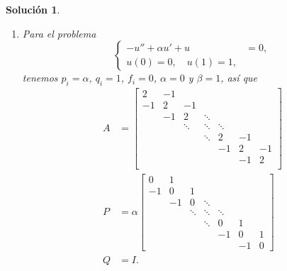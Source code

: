 \documentclass[11pt]{article}
\newtheorem*{sol}{Solución}
\begin{document}
\begin{sol}
\begin{enumerate}
\begin{equation}
      .\end{equation}
      Luego, si $|h|<\delta$, entonces
      \begin{equation}
        |\phi(h)| \geq (\det A) / 2 > 0
      ,\end{equation}
      de donde se sigue que
      \begin{equation}
        \phi(h) = \det \left(A + \frac{1}{2}hP + h^{2}Q\right) \neq 0
      ,\end{equation}
      así que $A + \frac{1}{2}hP + h^{2}Q$ es invertible y el problema
      tiene solución
       \begin{equation}
        U = \left(A + \frac{1}{2}hP + h^{2}Q\right)^{-1}
        (-h^{2}F + hE)
      .\end{equation}
    \item
      Para el problema
      \begin{equation}
        \left\{
          \begin{aligned}
            -u'' + \alpha u' + u &= 0,
            \\
            u(0) = 0,\quad u(1)=1,
          \end{aligned}
        \right.
      \end{equation}
      tenemos $p_i=\alpha$, $q_i=1$, $f_i=0$, $\alpha=0$ y $\beta=1$,
      así que
      \begin{align}
          A
          &=
          \begin{bmatrix}
            2 & -1 \\
            -1 & 2 & -1 \\[-2mm]
               & -1 & 2 & \ddots \\
               & & \ddots & \ddots & \ddots \\
               &  & & \ddots & 2 & -1 \\
               &&&& -1 & 2 & -1 \\
               &&&& & -1 & 2 \\
          \end{bmatrix}
        \\
          P
          &=
          \alpha
          \begin{bmatrix}
            0 & 1 \\
            -1 & 0 & 1 \\[-2mm]
               & -1 & 0 & \ddots \\
               & & \ddots & \ddots & \ddots \\
               &  & & \ddots & 0 & 1 \\
               &&&& -1 & 0 & 1 \\
               &&&& & -1 & 0
          \end{bmatrix}
        \\
          Q
          &= I
      .\end{align}
      
      
      
      
  \end{enumerate}

\end{sol}
\end{document}
